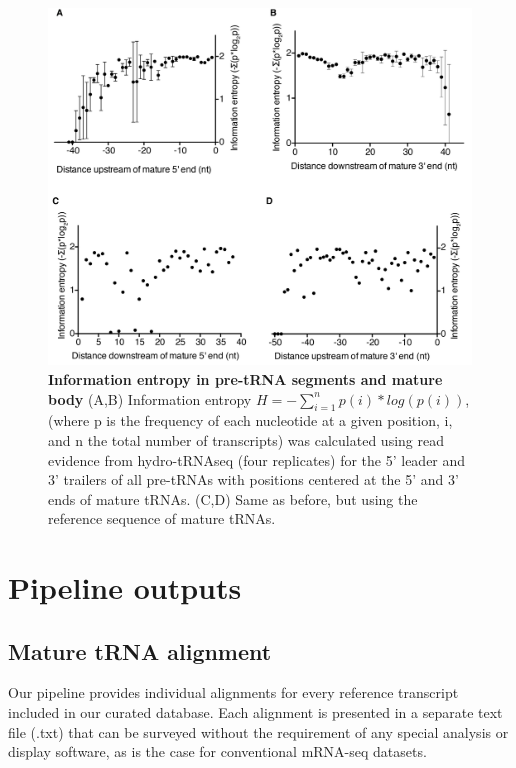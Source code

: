 \documentclass[12pt]{rockefeller}
\begin{document}
\begin{figure}[!ht]%
\centering
\includegraphics[width=\textwidth]{supp1.png}%
\caption[Information entropy in pre-tRNA segments and mature body]{\textbf{Information entropy in pre-tRNA segments and mature body}
(A,B) Information entropy $H = -\sum_{i=1}^np(i)*log(p(i))$, (where p is the frequency of each nucleotide at a given position, i, and n the total number of transcripts) was calculated using read evidence from hydro-tRNAseq (four replicates) for the 5’ leader and 3’ trailers of all pre-tRNAs with positions centered at the 5’ and 3’ ends of mature tRNAs. (C,D) Same as before, but using the reference sequence of mature tRNAs.}
\centering
\label{supp1}%
\end{figure}

\section{Pipeline outputs}
\subsection{Mature tRNA alignment}

Our pipeline provides individual alignments for every reference transcript included in our curated database. Each alignment is presented in a separate text file (.txt) that can be surveyed without the requirement of any special analysis or display software, as is the case for conventional mRNA-seq datasets. 
\end{document}
